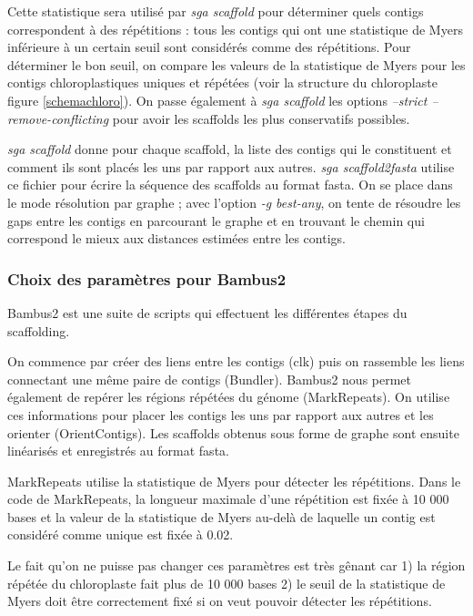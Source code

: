 \documentclass[a4paper]{article}
\begin{document}
Cette statistique sera utilisé par \textit{sga scaffold} pour déterminer quels contigs correspondent à des répétitions : tous les contigs qui ont une statistique de Myers inférieure à un certain seuil sont considérés comme des répétitions. Pour déterminer le bon seuil, on compare les valeurs de la statistique de Myers pour les contigs chloroplastiques uniques et répétées (voir la structure du chloroplaste figure \ref{schemachloro}). On passe également à \textit{sga scaffold} les options \textit{--strict --remove-conflicting} pour avoir les scaffolds les plus conservatifs possibles. 

\textit{sga scaffold} donne pour chaque scaffold, la liste des contigs qui le constituent et comment ils sont placés les uns par rapport aux autres. \textit{sga scaffold2fasta} utilise ce fichier pour écrire la séquence des scaffolds au format fasta. On se place dans le mode résolution par graphe ; avec l'option \textit{-g best-any}, on tente de résoudre les gaps entre les contigs en parcourant le graphe et en trouvant le chemin qui correspond le mieux aux distances estimées entre les contigs. 

\subsubsection{Choix des paramètres pour Bambus2}

Bambus2 est une suite de scripts qui effectuent les différentes étapes du scaffolding. 

On commence par créer des liens entre les contigs (clk) puis on rassemble les liens connectant une même paire de contigs (Bundler). Bambus2 nous permet également de repérer les régions répétées du génome (MarkRepeats). On  utilise ces informations pour placer les contigs les uns par rapport aux autres et les orienter (OrientContigs). Les scaffolds obtenus sous forme de graphe sont ensuite linéarisés et enregistrés au format fasta.  

MarkRepeats utilise la statistique de Myers pour détecter les répétitions. Dans le code de MarkRepeats, la longueur maximale d'une répétition est fixée à 10 000 bases et la valeur de la statistique de Myers au-delà de laquelle un contig est considéré comme unique est fixée à 0.02. 

Le fait qu'on ne puisse pas changer ces paramètres est très gênant car 1) la région répétée du chloroplaste fait plus de 10 000 bases 2) le seuil de la statistique de Myers doit être correctement fixé si on veut pouvoir détecter les répétitions. 
\end{document}
